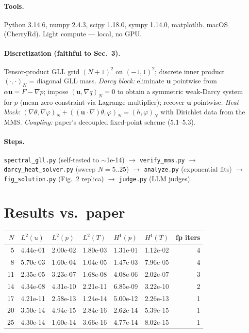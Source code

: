 \documentclass[11pt]{article}
\begin{document}
\paragraph{Tools.} Python 3.14.6, numpy 2.4.3, scipy 1.18.0, sympy 1.14.0, matplotlib. macOS
(CherryRd). Light compute --- local, no GPU.

\paragraph{Discretization (faithful to Sec.~3).}
Tensor-product GLL grid $(N{+}1)^2$ on $(-1,1)^2$; discrete inner product $(\cdot,\cdot)_N$ =
diagonal GLL mass. \emph{Darcy block:} eliminate $\mathbf{u}$ pointwise from
$\alpha\mathbf{u}=F-\nabla p$; impose $(\mathbf{u},\nabla q)_N=0$ to obtain a symmetric weak-Darcy
system for $p$ (mean-zero constraint via Lagrange multiplier); recover $\mathbf{u}$ pointwise.
\emph{Heat block:} $(\nabla\theta,\nabla\varphi)_N + ((\mathbf{u}\!\cdot\!\nabla)\theta,\varphi)_N
= (h,\varphi)_N$ with Dirichlet data from the MMS. \emph{Coupling:} paper's decoupled fixed-point
scheme (5.1--5.3).

\paragraph{Steps.}
\texttt{spectral\_gll.py} (self-tested to $\sim$1e-14) $\to$ \texttt{verify\_mms.py} $\to$
\texttt{darcy\_heat\_solver.py} (sweep $N=5..25$) $\to$ \texttt{analyze.py} (exponential fits) $\to$
\texttt{fig\_solution.py} (Fig.~2 replica) $\to$ \texttt{judge.py} (LLM judges).

\section{Results vs.\ paper}
\label{sec:results}
\begin{center}
\small
\begin{tabular}{rlllll r}
\toprule
$N$ & $L^2(u)$ & $L^2(p)$ & $L^2(T)$ & $H^1(p)$ & $H^1(T)$ & fp iters \\
\midrule
 5 & 4.44e-01 & 2.00e-02 & 1.80e-03 & 1.31e-01 & 1.12e-02 & 4 \\
 8 & 5.70e-03 & 1.60e-04 & 1.04e-05 & 1.47e-03 & 7.96e-05 & 4 \\
11 & 2.35e-05 & 3.23e-07 & 1.68e-08 & 4.08e-06 & 2.02e-07 & 3 \\
14 & 4.34e-08 & 4.31e-10 & 2.21e-11 & 6.85e-09 & 3.22e-10 & 2 \\
17 & 4.21e-11 & 2.58e-13 & 1.24e-14 & 5.00e-12 & 2.26e-13 & 1 \\
20 & 3.50e-14 & 4.94e-15 & 2.84e-16 & 2.62e-14 & 5.39e-15 & 1 \\
25 & 4.30e-14 & 1.60e-14 & 3.66e-16 & 4.77e-14 & 8.02e-15 & 1 \\
\bottomrule
\end{tabular}
\end{center}
\end{document}

